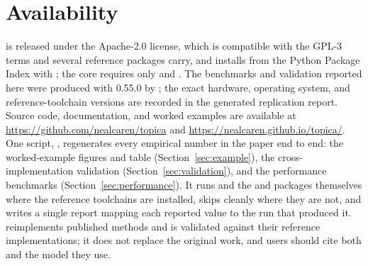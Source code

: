\documentclass[article]{jss}
\begin{document}
\section{Availability}\label{sec:availability}

 is released under the Apache-2.0 license, which is compatible with
the GPL-3 terms  and several reference packages carry, and installs
from the Python Package Index with ; the core requires
only  and . The benchmarks and validation reported here were
produced with  0.55.0 by ; the exact
hardware, operating system, and reference-toolchain versions are recorded in the
generated replication report. Source code, documentation, and worked examples are available at
\url{https://github.com/nealcaren/topica} and
\url{https://nealcaren.github.io/topica/}. One script, ,
regenerates every empirical number in the paper end to end: the worked-example
figures and table (Section~\ref{sec:example}), the cross-implementation validation
(Section~\ref{sec:validation}), and the performance benchmarks
(Section~\ref{sec:performance}). It runs  and the 
 and  packages themselves where the reference toolchains are
installed, skips cleanly where they are not, and writes a single report mapping
each reported value to the run that produced it.  reimplements published
methods and is validated against their reference implementations; it does not
replace the original work, and users should cite both 
\citep{caren2026topica} and the model they use.


\end{document}

